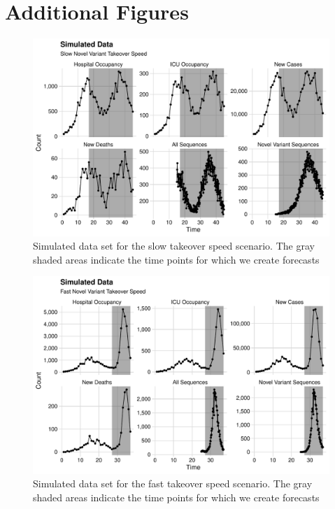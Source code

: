 \section{Additional Figures}

\begin{figure}
    \centering
    \includegraphics[width=1.0\columnwidth]{simulated_binned_data_slow_plot}
    \caption[Simulated data set for the slow takeover speed scenario.]{Simulated data set for the slow takeover speed scenario.
    The gray shaded areas indicate the time points for which we create forecasts}
    \label{ch_5:fig:simulated_binned_data_slow_plot}
\end{figure}

\begin{figure}
    \centering
    \includegraphics[width=1.0\columnwidth]{simulated_binned_data_fast_plot}
    \caption[Simulated data set for the fast takeover speed scenario.]{Simulated data set for the fast takeover speed scenario.
    The gray shaded areas indicate the time points for which we create forecasts}
    \label{ch_5:fig:simulated_binned_data_fast_plot}
\end{figure}

